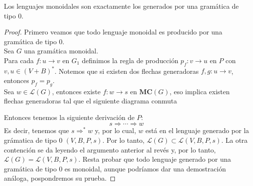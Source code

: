 \documentclass[../main.tex]{subfiles}
\begin{document}
	\begin{thm}
	Los lenguajes monoidales son exactamente los generados por una gramática de tipo 0. 
	\end{thm}
	\begin{proof}
	Primero veamos que todo lenguaje monoidal es producido por una gramática de tipo 0. \\
	Sea $G$ una gramática monoidal. \\
	Para cada $f:u \to v$ en $G_1$ definimos la regla de producción $p_f: v \rightarrow u$ en $P$ con $v,u \in (V+B)^*$. Notemos que si existen dos flechas generadoras $f,g: u \to v$, entonces $p_f=p_g$.  \\
	Sea $w \in \mathcal{L}(G)$, entonces existe $f:w \to s$ en $\textbf{MC}(G)$, eso implica existen flechas generadoras tal que el siguiente diagrama conmuta

	\begin{center}
	\end{center}
	 Entonces tenemos la siguiente derivación de $P$:
	 \[
	 	s \Rightarrow \cdots \Rightarrow w
	 \]
	 Es decir, tenemos que $s \Rightarrow^* w$ y, por lo cual, $w$ está en el lenguaje generado por la grámatica de tipo 0 $(V,B,P,s)$. Por lo tanto, $\mathcal{L}(G)\subset \mathcal{L}(V,B,P,s)$. La otra contención se da leyendo el argumento anterior al revés y, por lo tanto, $\mathcal{L}(G) = \mathcal{L}(V,B,P,s)$.
	 Resta probar que todo lenguaje generado por una gramática de tipo 0 es monoidal, aunque podríamos dar una demostración análoga, pospondremos su prueba.
	\end{proof}
\end{document}
